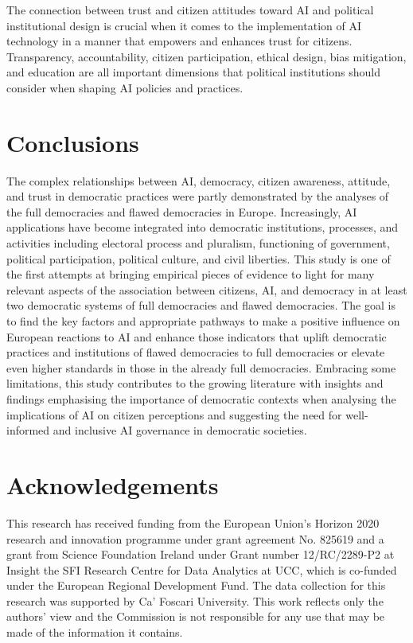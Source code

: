 \documentclass[
]{ceurart}
\begin{document}
The connection between trust and citizen attitudes toward AI and political institutional design is crucial when it comes to the implementation of AI technology in a manner that empowers and enhances trust for citizens. Transparency, accountability, citizen participation, ethical design, bias mitigation, and education are all important dimensions that political institutions should consider when shaping AI policies and practices.


\section{Conclusions}
The complex relationships between AI, democracy, citizen awareness, attitude, and trust in democratic practices were partly demonstrated by the analyses of the full democracies and flawed democracies in Europe. Increasingly, AI applications have become integrated into democratic institutions, processes, and activities including electoral process and pluralism, functioning of government, political participation, political culture, and civil liberties. This study is one of the first attempts at bringing empirical pieces of evidence to light for many relevant aspects of the association between citizens, AI, and democracy in at least two democratic systems of full democracies and flawed democracies. The goal is to find the key factors and appropriate pathways to make a positive influence on European reactions to AI and enhance those indicators that uplift democratic practices and institutions of flawed democracies to full democracies or elevate even higher standards in those in the already full democracies. 
Embracing some limitations, this study contributes to the growing literature with insights and findings emphasising the importance of democratic contexts when analysing the implications of AI on citizen perceptions and suggesting the need for well-informed and inclusive AI governance in democratic societies.

\section{Acknowledgements}
This research has received funding from the European Union’s Horizon 2020 research and innovation programme under grant agreement No. 825619 and a grant from Science Foundation Ireland under Grant number 12/RC/2289-P2 at Insight the SFI Research Centre for Data Analytics at UCC, which is co-funded under the European Regional Development Fund. The data collection for this research was supported by Ca' Foscari University. This work reflects only the authors' view and the Commission is not responsible for any use that may be made of the information it contains.



\appendix
\end{document}
